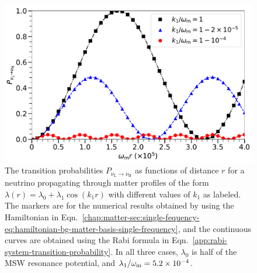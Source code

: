 \begin{figure}[h!tbp]
                \includegraphics[width=\columnwidth]{chapters/assets/rabi/rabiOscillationsNeutrinoCoincidence-single-frequency}
                \caption{The transition probabilities $P_{\nu_\mathrm{L}\to\nu_\mathrm{H}}$ as functions of distance $r$ for a neutrino propagating through matter profiles of the form $\lambda(r)=\lambda_0 + \lambda_1 \cos (k_1 r)$ with different values of $k_1$ as labeled. The markers are for the numerical results obtained by using the Hamiltonian in Eqn.~\eqref{chap:matter-sec:single-fequency-eq:hamiltonian-bg-matter-basis-single-frequency}, and the continuous curves are obtained using the Rabi formula in Eqn.~\eqref{app:rabi-system-transition-probability}. In all three cases, $\lambda_0$ is half of the MSW resonance potential, and $\lambda_1/\omega_\mathrm m=5.2\times 10^{-4}$.}
                \label{fig-rabiOscillationsNeutrinoCoincidence}
\end{figure}


